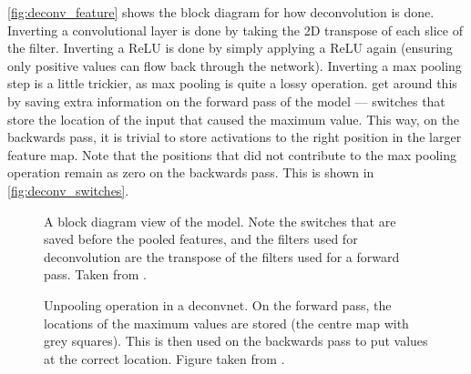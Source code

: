   \autoref{fig:deconv_feature} shows the block diagram for how deconvolution is
  done. Inverting a convolutional layer is done by taking the 2D transpose of each
  slice of the filter. Inverting a ReLU is done by simply applying a ReLU again
  (ensuring only positive values can flow back through the network). Inverting
  a max pooling step is a little trickier, as max pooling is quite a lossy
  operation. \citeauthor{zeiler_adaptive_2011} get around this by saving extra
  information on the forward pass of the model --- switches that store the
  location of the input that caused the maximum value. This way, on the
  backwards pass, it is trivial to store activations to the right position in
  the larger feature map. Note that the positions that did not contribute to
  the max pooling operation remain as zero on the backwards pass. This is shown
  in \autoref{fig:deconv_switches}.

  \begin{figure}
    \centering
      \caption[Deconvolution Network Block Diagram]
              {A block diagram view of the model. Note the switches that
              are saved before the pooled features, and the filters
              used for deconvolution are the transpose of the filters used for
              a forward pass. Taken from
              \citep{zeiler_visualizing_compact_2014}.}
      \label{fig:deconv_feature}
  \end{figure}

  \begin{figure}
    \centering
      \caption[Unpooling operation in a deconvnet]
              {Unpooling operation in a deconvnet. On the forward pass, the
              locations of the maximum values are stored (the centre map with
              grey squares). This is then used on the backwards pass to put
              values at the correct location. Figure taken from \citep{zeiler_visualizing_compact_2014}.}
      \label{fig:deconv_switches}
  \end{figure}
  

